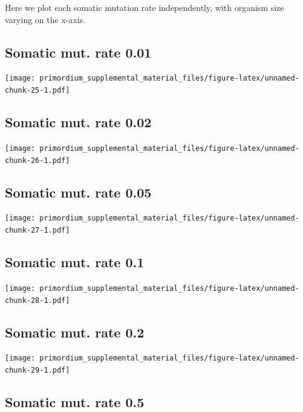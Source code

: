 \documentclass[]{book}
\begin{document}
Here we plot each somatic mutation rate independently, with organism size varying on the x-axis.

\hypertarget{somatic-mut.-rate-0.01}{%
\subsection{Somatic mut. rate 0.01}\label{somatic-mut.-rate-0.01}}

\texttt{[image: primordium\_supplemental\_material\_files/figure-latex/unnamed-chunk-25-1.pdf]}

\hypertarget{somatic-mut.-rate-0.02}{%
\subsection{Somatic mut. rate 0.02}\label{somatic-mut.-rate-0.02}}

\texttt{[image: primordium\_supplemental\_material\_files/figure-latex/unnamed-chunk-26-1.pdf]}

\hypertarget{somatic-mut.-rate-0.05}{%
\subsection{Somatic mut. rate 0.05}\label{somatic-mut.-rate-0.05}}

\texttt{[image: primordium\_supplemental\_material\_files/figure-latex/unnamed-chunk-27-1.pdf]}

\hypertarget{somatic-mut.-rate-0.1}{%
\subsection{Somatic mut. rate 0.1}\label{somatic-mut.-rate-0.1}}

\texttt{[image: primordium\_supplemental\_material\_files/figure-latex/unnamed-chunk-28-1.pdf]}

\hypertarget{somatic-mut.-rate-0.2}{%
\subsection{Somatic mut. rate 0.2}\label{somatic-mut.-rate-0.2}}

\texttt{[image: primordium\_supplemental\_material\_files/figure-latex/unnamed-chunk-29-1.pdf]}

\hypertarget{somatic-mut.-rate-0.5}{%
\subsection{Somatic mut. rate 0.5}\label{somatic-mut.-rate-0.5}}
\end{document}
